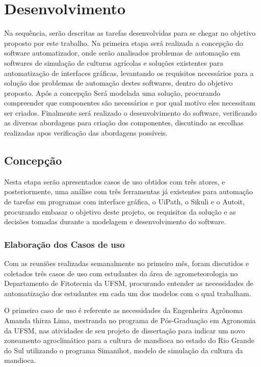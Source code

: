\documentclass[tg]{mdtufsm}
\begin{document}
	\chapter{Desenvolvimento}

        Na sequência, serão descritas as tarefas desenvolvidas para se chegar no objetivo proposto por este trabalho.
        Na primeira etapa será realizada a concepção do software automatizador, onde serão analisados problemas de automação em softwares de simulação de culturas agrícolas e soluções existentes para automatização de interfaces gráficas, levantando os requisitos necessários para a solução dos problemas de automação destes softwares, dentro do objetivo proposto.
        Após a concepção Será modelada uma solução, procurando compreender que componentes são necessários e por qual motivo eles necessitam ser criados.
        Finalmente será realizado o desenvolvimento do software, verificando as diversas abordagens para criação dos componentes, discutindo as escolhas realizadas apos verificação das abordagens possíveis.

        \section {Concepção}

            Nesta etapa serão apresentados casos de uso obtidos com três atores, e posteriormente, uma análise com três ferramentas já existentes para automação de tarefas em programas com interface gráfica, o UiPath, o Sikuli e o Autoit, procurando embasar o objetivo deste projeto, os requisitos da solução e as decisões tomadas durante a modelagem e desenvolvimento do software.

            \subsection {Elaboração dos Casos de uso}

                Com as reuniões realizadas semanalmente no primeiro mês, foram discutidos e coletados três casos de uso com estudantes da área de agrometeorologia no Departamento de Fitotecnia da UFSM, procurando entender as necessidades de automatização dos estudantes em cada um dos modelos com o qual trabalham.

            	O primeiro caso de uso é referente as necessidades da Engenheira Agrônoma Amanda thirza Lima, mestranda no programa de Pós-Graduação em Agronomia da UFSM, nas atividades de seu projeto de dissertação para indicar um novo zoneamento agroclimático para a cultura de mandioca no estado do Rio Grande do Sul utilizando o programa Simanihot, modelo de simulação da cultura da mandioca.
\end{document}
